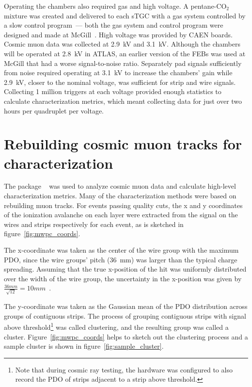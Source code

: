 Operating the chambers also required gas and high voltage. A pentane-CO$_{2}$ mixture was created and delivered to each sTGC with a gas system controlled by a slow control program~--- both the gas system and control program were designed and made at McGill~\cite{keyes_development_2017}. High voltage was provided by CAEN boards. Cosmic muon data was collected at 2.9~kV and 3.1~kV. Although the chambers will be operated at 2.8~kV in ATLAS, an earlier version of the FEBs was used at McGill that had a worse signal-to-noise ratio. Separately pad signals sufficiently from noise required operating at 3.1~kV to increase the chambers' gain while 2.9~kV, closer to the nominal voltage, was sufficient for strip and wire signals. Collecting 1 million triggers at each voltage provided enough statistics to calculate characterization metrics, which meant collecting data for just over two hours per quadruplet per voltage.

\section{Rebuilding cosmic muon tracks for characterization}

The package ~\cite{lefebvre_tgc_analysis} was used to analyze cosmic muon data and calculate high-level characterization metrics. Many of the characterization methods were based on rebuilding muon tracks. For events passing quality cuts, the x and y coordinates of the ionization avalanche on each layer were extracted from the signal on the wires and strips respectively for each event, as is sketched in figure~\ref{fig:mwpc_coords}.

The x-coordinate was taken as the center of the wire group with the maximum PDO, since the wire groups' pitch (\SI{36}{\milli\meter}) was larger than the typical charge spreading. Assuming that the true x-position of the hit was uniformly distributed over the width of the wire group, the uncertainty in the x-position was given by $\frac{36 mm}{\sqrt{12}} = 10 mm$~\cite{Sauli:117989}.

The y-coordinate was taken as the Gaussian mean of the PDO distribution across groups of contiguous strips. The process of grouping contiguous strips with signal above threshold\footnote{Note that during cosmic ray testing, the hardware was configured to also record the PDO of strips adjacent to a strip above threshold.} was called clustering, and the resulting group was called a cluster. Figure~\ref{fig:mwpc_coords} helps to sketch out the clustering process and a sample cluster is shown in figure~\ref{fig:sample_cluster}. 

